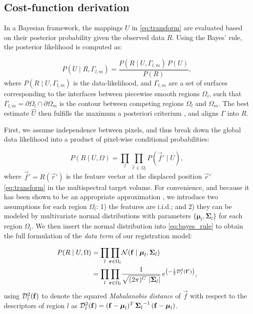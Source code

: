 \subsection{Cost-function derivation}\label{sec:methods_map}

In a Bayesian framework, the mappings $U$ in \eqref{eq:transform} are
  evaluated based on their posterior probability given the observed data
  $R$.
Using the Bayes' rule, the posterior likelihood is computed as:

  \begin{equation}
  P(U \mid R,\Gamma_{l,m}) = \frac{P(R \mid U,\Gamma_{l,m})\, P(U)}{P(R)},
  \label{eq:bayes_rule}
  \end{equation}
%
  where $P(R \mid U,\Gamma_{l,m})$ is the data-likelihood, and
  $\Gamma_{l,m}$ are a set of surfaces corresponding to the interfaces
  between piecewise smooth regions $\Omega_i$, such that
  $\Gamma_{l,m} = \partial \Omega_l \cap \partial \Omega_m$ is the
  contour between competing regions $\Omega_l$ and $\Omega_m$.
The best estimate $\hat{U}$ then fulfills the maximum a posteriori criterium
  \citep{bishop_pattern_2006}, and aligns $\Gamma$ into $R$.

First, we assume independence between pixels, and thus break down the
  global data likelihood into a product of pixel-wise conditional probabilities:

  \begin{equation}
  P(R \mid U,\Omega) = \underset{l}{\prod} \underset{\vec{r}\in \Omega_l}{\prod}
    P\left( \vec{f}' \mid U \right),
  \label{eq:bayes_aposteriori}
  \end{equation}
%
  where $\vec{f}' = R(\vec{r}')$ is the feature vector at the displaced
  position $\vec{r}'$ \eqref{eq:transform} in the multispectral target
  volume.
For convenience, and because it has been shown to be an appropriate approximation
  \citep{leemput_automated_1999,cuadra_comparison_2005}, we introduce two assumptions for each
  region $\Omega_l$:
  1) the features are i.i.d.; and 2) they can be modeled by multivariate normal
  distributions with parameters $\lbrace \boldsymbol{\mu}_l, \boldsymbol{\Sigma}_{l} \rbrace$
  for each region $\Omega_l$.
We then insert the normal distribution into \eqref{eq:bayes_rule} to obtain the full
  formulation of the \emph{data term} of our registration model:

 	\begin{align}
  P( R \mid U, \Omega ) &= \underset{l}{\prod} \underset{\vec{r} \in \Omega_l}{\prod}
  \mathcal{N} ( \vec{f} \mid \boldsymbol{\mu}_l, \boldsymbol{\Sigma}_{l} ) \notag\\
  &= \underset{l}{\prod} \underset{\vec{r} \in \Omega_l}{\prod} \frac{1}{ \sqrt{(2\pi)^{C}\,\left|\boldsymbol{\Sigma}_{l}\right|}}\,{e^{\left(-\frac{1}{2}
  \mdist{f'}{l} \right)}},
  \label{eq:pdf}
  \end{align}
%
  using $\mdist{f}{l}$ to denote the squared \emph{Mahalanobis distance} of $\vec{f}$ with respect
  to the descriptors of region $l$ as
  $\mdist{f}{l} = (\vec{f} - \boldsymbol{\mu}_l)^T \, {\boldsymbol{\Sigma}_l}^{-1} \, (\vec{f} - \boldsymbol{\mu}_l)$.


